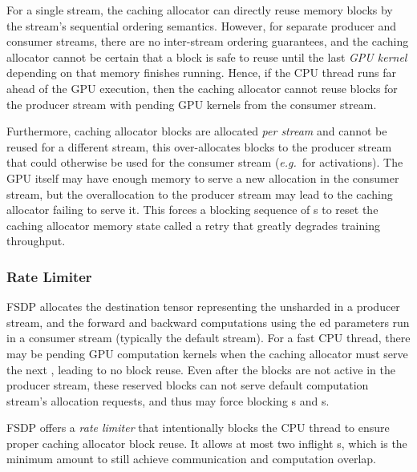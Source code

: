 For a single stream, the caching allocator can directly reuse memory blocks by the stream's sequential ordering semantics. However, for separate producer and consumer streams, there are no inter-stream ordering guarantees, and the caching allocator cannot be certain that a block is safe to reuse until the last \textit{GPU kernel} depending on that memory finishes running. Hence, if the CPU thread runs far ahead of the GPU execution, then the caching allocator cannot reuse blocks for the producer stream with pending GPU kernels from the consumer stream.

Furthermore, caching allocator blocks are allocated \textit{per stream} and cannot be reused for a different stream, this over-allocates blocks to the producer stream that could otherwise be used for the consumer stream (\textit{e.g.}\ for activations). The GPU itself may have enough memory to serve a new allocation in the consumer stream, but the overallocation to the producer stream may lead to the caching allocator failing to serve it. This forces a blocking sequence of s to reset the caching allocator memory state called a  retry that greatly degrades training throughput.

\subsubsection{Rate Limiter}
\label{subsubsection:rate limiter}\hfill \break

FSDP allocates the  destination tensor representing the unsharded  in a producer stream, and the forward and backward computations using the ed parameters run in a consumer stream (typically the default stream). For a fast CPU thread, there may be pending GPU computation kernels when the caching allocator must serve the next , leading to no block reuse. Even after the blocks are not active in the  producer stream, these reserved blocks can not serve default computation stream's allocation requests, and thus may force blocking s and s. 


FSDP offers a \textit{rate limiter} that intentionally blocks the CPU thread to ensure proper caching allocator block reuse. It allows at most two inflight s, which is the minimum amount to still achieve communication and computation overlap.

